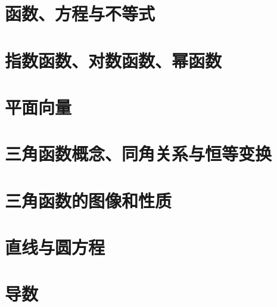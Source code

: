 \section{函数、方程与不等式}
\section{指数函数、对数函数、幂函数}
\section{平面向量}
\section{三角函数概念、同角关系与恒等变换}
\section{三角函数的图像和性质}
\section{直线与圆方程}
\section{导数}
